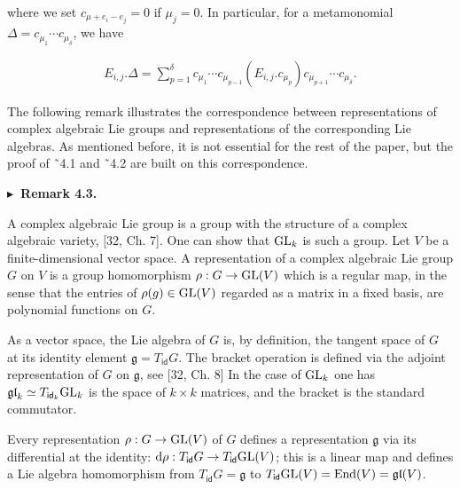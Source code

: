 where we set $c_{\mu+e_{i}-e_{j}}=0$ if $\mu_{j}=0$.
In particular, for a metamonomial $\Delta=c_{\mu_{1}}\cdots c_{\mu_{\delta}}$, we have



\[\begin{aligned}
E_{i,j}.\Delta=\textstyle\sum_{p=1}^{\delta}c_{\mu_{1}}\cdots c_{\mu_{p-1}}(E_{i,j}.c_{\mu_{p}})c_{\mu_{p+1}}\cdots c_{\mu_{\delta}}.
\end{aligned}\]





The following remark illustrates the correspondence between representations of complex algebraic Lie groups and representations of the corresponding Lie algebras. As mentioned before, it is not essential for the rest of the paper, but the proof of ˜4.1 and ˜4.2 are built on this correspondence.





\par\medskip\noindent\textbf{$\blacktriangleright$ Remark 4.3.}\par



A complex algebraic Lie group is a group with the structure of a complex algebraic variety, [32, Ch. 7]. One can show that $\textnormal{GL}_{k}$ is such a group. Let $V$ be a finite-dimensional vector space. A representation of a complex algebraic Lie group $G$ on $V$ is a group homomorphism $\rho:G\to\textnormal{GL}(V)$ which is a regular map, in the sense that the entries of $\rho(g)\in\textnormal{GL}(V)$ regarded as a matrix in a fixed basis, are polynomial functions on $G$.





As a vector space, the Lie algebra of $G$ is, by definition, the tangent space of $G$ at its identity element $\mathfrak{g}=T_{\mathsf{id}}G$. The bracket operation is defined via the adjoint representation of $G$ on $\mathfrak{g}$, see [32, Ch. 8] In the case of $\textnormal{GL}_{k}$ one has $\mathfrak{gl}_{k}\simeq T_{\mathsf{id}_{k}}\textnormal{GL}_{k}$ is the space of $k\times k$ matrices, and the bracket is the standard commutator.





Every representation $\rho:G\to\textnormal{GL}(V)$ of $G$ defines a representation $\mathfrak{g}$ via its differential at the identity: $\textnormal{d}\rho:T_{\mathsf{id}}G\to T_{\mathsf{id}}\textnormal{GL}(V)$; this is a linear map and defines a Lie algebra homomorphism from $T_{\mathsf{id}}G=\mathfrak{g}$ to $T_{\mathsf{id}}\textnormal{GL}(V)=\textnormal{End}(V)=\mathfrak{gl}(V)$.






